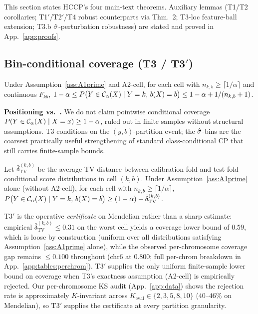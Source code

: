 
This section states HCCP's four main-text theorems. Auxiliary lemmas (T1/T2 corollaries; T1$'$/T2$'$/T4 robust counterparts via \citet{barber2023exchangeability} Thm.~2; T3-loc feature-ball extension; T3.b $\hat{\sigma}$-perturbation robustness) are stated and proved in App.~\ref{app:proofs}.

\subsection{Bin-conditional coverage (T3 / T3$'$)}
\label{sec:theory:t3prime}

\begin{theorem}
\label{thm:t3}
Under Assumption~\ref{ass:A1prime} and A2-cell, for each cell with $n_{k,b} \geq \lceil 1/\alpha \rceil$ and continuous $F_{kb}$,
$1 - \alpha \leq P\bigl(Y \in \mathcal{C}_\alpha(X) \mid Y = k,\, b(X) = b\bigr) \leq 1 - \alpha + 1 / (n_{k,b} + 1)$.
\end{theorem}

\noindent\textbf{Positioning vs.\ \citet{barber2020limits}.} We do not claim pointwise conditional coverage $P(Y \in \mathcal{C}_\alpha(X) \mid X = x) \geq 1 - \alpha$, ruled out in finite samples without structural assumptions. T3 conditions on the $(y, b)$-partition event; the $\hat{\sigma}$-bins are the coarsest practically useful strengthening of standard class-conditional CP that still carries finite-sample bounds.

\begin{theorem}
\label{thm:t3prime_main}
Let $\bar\delta_{\mathrm{TV}}^{(k,b)}$ be the average TV distance between calibration-fold and test-fold conditional score distributions in cell $(k, b)$. Under Assumption~\ref{ass:A1prime} alone (without A2-cell), for each cell with $n_{k,b} \geq \lceil 1/\alpha\rceil$,
$P\bigl(Y \in \mathcal{C}_\alpha(X) \mid Y = k,\, b(X) = b\bigr) \geq (1 - \alpha) - \bar\delta_{\mathrm{TV}}^{(k,b)}$.
\end{theorem}

T3$'$ is the operative \emph{certificate} on Mendelian rather than a sharp estimate: empirical $\bar\delta_{\mathrm{TV}}^{(k,b)} \leq 0.31$ on the worst cell yields a coverage lower bound of $0.59$, which is loose by construction (uniform over all distributions satisfying Assumption~\ref{ass:A1prime} alone), while the observed per-chromosome coverage gap remains $\leq 0.100$ throughout (chr6 at $0.800$; full per-chrom breakdown in App.~\ref{app:tables:perchrom}). T3$'$ supplies the only uniform finite-sample lower bound on coverage when T3's exactness assumption (A2-cell) is empirically rejected. Our per-chromosome KS audit (App.~\ref{app:data}) shows the rejection rate is approximately $K$-invariant across $K_{\mathrm{eval}} \in \{2, 3, 5, 8, 10\}$ ($40$--$46\%$ on Mendelian), so T3$'$ supplies the certificate at every partition granularity.

